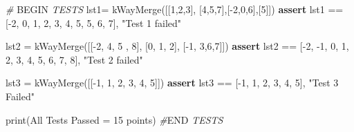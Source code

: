 \documentclass[
]{article}
\newenvironment{Shaded}{}{}
\newcommand{\BuiltInTok}[1]{\textcolor[rgb]{0.00,0.50,0.00}{#1}}
\newcommand{\CommentTok}[1]{\textcolor[rgb]{0.38,0.63,0.69}{\textit{#1}}}
\newcommand{\ControlFlowTok}[1]{\textcolor[rgb]{0.00,0.44,0.13}{\textbf{#1}}}
\newcommand{\DecValTok}[1]{\textcolor[rgb]{0.25,0.63,0.44}{#1}}
\newcommand{\NormalTok}[1]{#1}
\newcommand{\OperatorTok}[1]{\textcolor[rgb]{0.40,0.40,0.40}{#1}}
\newcommand{\RegionMarkerTok}[1]{#1}
\newcommand{\StringTok}[1]{\textcolor[rgb]{0.25,0.44,0.63}{#1}}
\begin{document}
\begin{Shaded}
\begin{Highlighting}[]
\CommentTok{\# }\RegionMarkerTok{BEGIN}\CommentTok{ TESTS}
\NormalTok{lst1}\OperatorTok{=}\NormalTok{ kWayMerge([[}\DecValTok{1}\NormalTok{,}\DecValTok{2}\NormalTok{,}\DecValTok{3}\NormalTok{], [}\DecValTok{4}\NormalTok{,}\DecValTok{5}\NormalTok{,}\DecValTok{7}\NormalTok{],[}\OperatorTok{{-}}\DecValTok{2}\NormalTok{,}\DecValTok{0}\NormalTok{,}\DecValTok{6}\NormalTok{],[}\DecValTok{5}\NormalTok{]])}
\ControlFlowTok{assert}\NormalTok{ lst1 }\OperatorTok{==}\NormalTok{ [}\OperatorTok{{-}}\DecValTok{2}\NormalTok{, }\DecValTok{0}\NormalTok{, }\DecValTok{1}\NormalTok{, }\DecValTok{2}\NormalTok{, }\DecValTok{3}\NormalTok{, }\DecValTok{4}\NormalTok{, }\DecValTok{5}\NormalTok{, }\DecValTok{5}\NormalTok{, }\DecValTok{6}\NormalTok{, }\DecValTok{7}\NormalTok{], }\StringTok{"Test 1 failed"}

\NormalTok{lst2 }\OperatorTok{=}\NormalTok{ kWayMerge([[}\OperatorTok{{-}}\DecValTok{2}\NormalTok{, }\DecValTok{4}\NormalTok{, }\DecValTok{5}\NormalTok{ , }\DecValTok{8}\NormalTok{], [}\DecValTok{0}\NormalTok{, }\DecValTok{1}\NormalTok{, }\DecValTok{2}\NormalTok{], [}\OperatorTok{{-}}\DecValTok{1}\NormalTok{, }\DecValTok{3}\NormalTok{,}\DecValTok{6}\NormalTok{,}\DecValTok{7}\NormalTok{]])}
\ControlFlowTok{assert}\NormalTok{ lst2 }\OperatorTok{==}\NormalTok{ [}\OperatorTok{{-}}\DecValTok{2}\NormalTok{, }\OperatorTok{{-}}\DecValTok{1}\NormalTok{, }\DecValTok{0}\NormalTok{, }\DecValTok{1}\NormalTok{, }\DecValTok{2}\NormalTok{, }\DecValTok{3}\NormalTok{, }\DecValTok{4}\NormalTok{, }\DecValTok{5}\NormalTok{, }\DecValTok{6}\NormalTok{, }\DecValTok{7}\NormalTok{, }\DecValTok{8}\NormalTok{], }\StringTok{"Test 2 failed"}

\NormalTok{lst3 }\OperatorTok{=}\NormalTok{ kWayMerge([[}\OperatorTok{{-}}\DecValTok{1}\NormalTok{, }\DecValTok{1}\NormalTok{, }\DecValTok{2}\NormalTok{, }\DecValTok{3}\NormalTok{, }\DecValTok{4}\NormalTok{, }\DecValTok{5}\NormalTok{]])}
\ControlFlowTok{assert}\NormalTok{ lst3 }\OperatorTok{==}\NormalTok{ [}\OperatorTok{{-}}\DecValTok{1}\NormalTok{, }\DecValTok{1}\NormalTok{, }\DecValTok{2}\NormalTok{, }\DecValTok{3}\NormalTok{, }\DecValTok{4}\NormalTok{, }\DecValTok{5}\NormalTok{], }\StringTok{"Test 3 Failed"}

\BuiltInTok{print}\NormalTok{(}\StringTok{\textquotesingle{}All Tests Passed = 15 points\textquotesingle{}}\NormalTok{)}
\CommentTok{\#}\RegionMarkerTok{END}\CommentTok{ TESTS}
\end{Highlighting}
\end{Shaded}
\end{document}
